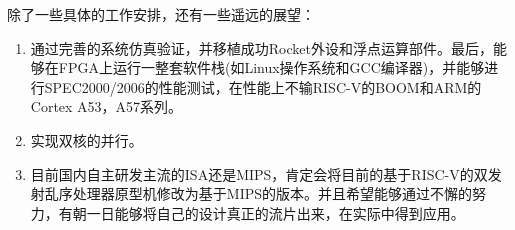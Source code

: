	除了一些具体的工作安排，还有一些遥远的展望：
	\begin{enumerate}[label=(\arabic*)]
		\item 通过完善的系统仿真验证，并移植成功Rocket外设和浮点运算部件。最后，能够在FPGA上运行一整套软件栈(如Linux操作系统和GCC编译器)，并能够进行SPEC2000/2006的性能测试，在性能上不输RISC-V的BOOM和ARM的Cortex A53，A57系列。
		\item 实现双核的并行。
		\item 目前国内自主研发主流的ISA还是MIPS，肯定会将目前的基于RISC-V的双发射乱序处理器原型机修改为基于MIPS的版本。并且希望能够通过不懈的努力，有朝一日能够将自己的设计真正的流片出来，在实际中得到应用。
	\end{enumerate}
	
	